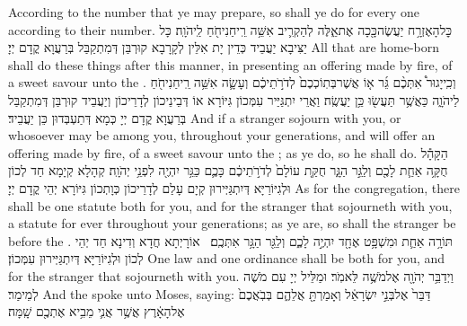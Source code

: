 {According to the number that ye may prepare, so shall ye do for every one according to their number.}{}
{כׇּל\maqqaf הָאֶזְרָ֥ח יַעֲשֶׂה\maqqaf כָּ֖כָה אֶת\maqqaf אֵ֑לֶּה לְהַקְרִ֛יב אִשֵּׁ֥ה רֵֽיחַ\maqqaf נִיחֹ֖חַ לַֽיהֹוָֽה׃}
{כָּל יַצִּיבָא יַעֲבֵיד כְּדֵין יָת אִלֵּין לְקָרָבָא קוּרְבַּן דְּמִתְקַבַּל בְּרַעֲוָא קֳדָם יְיָ׃}
{All that are home-born shall do these things after this manner, in presenting an offering made by fire, of a sweet savour unto the \lord.}{}
{וְכִֽי\maqqaf יָגוּר֩ אִתְּכֶ֨ם גֵּ֜ר א֤וֹ אֲשֶׁר\maqqaf בְּתֽוֹכְכֶם֙ לְדֹרֹ֣תֵיכֶ֔ם וְעָשָׂ֛ה אִשֵּׁ֥ה רֵֽיחַ\maqqaf נִיחֹ֖חַ לַיהֹוָ֑ה כַּאֲשֶׁ֥ר תַּעֲשׂ֖וּ כֵּ֥ן יַעֲשֶֽׂה׃}
{וַאֲרֵי יִתְגַּיַּיר עִמְּכוֹן גִּיּוֹרָא אוֹ דְּבֵינֵיכוֹן לְדָרֵיכוֹן וְיַעֲבֵיד קוּרְבַּן דְּמִתְקַבַּל בְּרַעֲוָא קֳדָם יְיָ כְּמָא דְּתַעְבְּדוּן כֵּן יַעֲבֵיד׃}
{And if a stranger sojourn with you, or whosoever may be among you, throughout your generations, and will offer an offering made by fire, of a sweet savour unto the \lord; as ye do, so he shall do.}{}
{הַקָּהָ֕ל חֻקָּ֥ה אַחַ֛ת לָכֶ֖ם וְלַגֵּ֣ר הַגָּ֑ר חֻקַּ֤ת עוֹלָם֙ לְדֹרֹ֣תֵיכֶ֔ם כָּכֶ֛ם כַּגֵּ֥ר יִהְיֶ֖ה לִפְנֵ֥י יְהֹוָֽה׃}
{קְהָלָא קְיָמָא חַד לְכוֹן וּלְגִיּוֹרַיָּא דְּיִתְגַּיְּירוּן קְיָם עָלַם לְדָרֵיכוֹן כְּוָתְכוֹן גִּיּוֹרָא יְהֵי קֳדָם יְיָ׃}
{As for the congregation, there shall be one statute both for you, and for the stranger that sojourneth with you, a statute for ever throughout your generations; as ye are, so shall the stranger be before the \lord.}{}
{תּוֹרָ֥ה אַחַ֛ת וּמִשְׁפָּ֥ט אֶחָ֖ד יִהְיֶ֣ה לָכֶ֑ם וְלַגֵּ֖ר הַגָּ֥ר אִתְּכֶֽם׃ \petucha }
{אוֹרָיְתָא חֲדָא וְדִינָא חַד יְהֵי לְכוֹן וּלְגִיּוֹרַיָּא דְּיִתְגַּיְּירוּן עִמְּכוֹן׃}
{One law and one ordinance shall be both for you, and for the stranger that sojourneth with you.}{}
{וַיְדַבֵּ֥ר יְהֹוָ֖ה אֶל\maqqaf מֹשֶׁ֥ה לֵּאמֹֽר׃}
{וּמַלֵּיל יְיָ עִם מֹשֶׁה לְמֵימַר׃}
{And the \lord\space spoke unto Moses, saying:}{}
{דַּבֵּר֙ אֶל\maqqaf בְּנֵ֣י יִשְׂרָאֵ֔ל וְאָמַרְתָּ֖ אֲלֵהֶ֑ם בְּבֹֽאֲכֶם֙ אֶל\maqqaf הָאָ֔רֶץ אֲשֶׁ֥ר אֲנִ֛י מֵבִ֥יא אֶתְכֶ֖ם שָֽׁמָּה׃}
